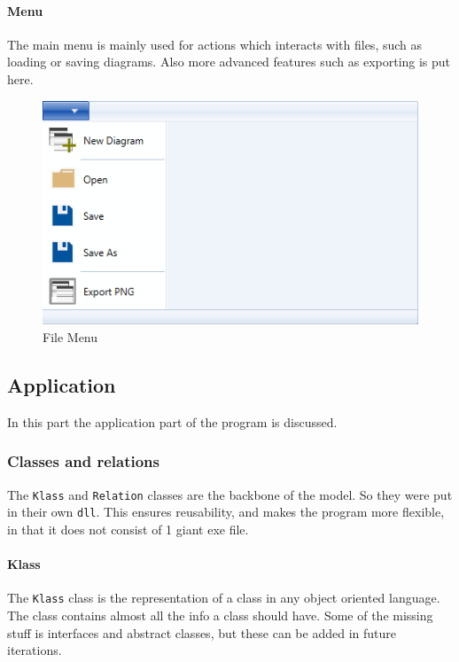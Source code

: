 \paragraph{Menu}
The main menu is mainly used for actions which interacts with files, such as
loading or saving diagrams. Also more advanced features such as exporting is put
here.

\begin{figure}[H]
\centering
\includegraphics[width=\linewidth]{"img/file menu"}
\caption{File Menu \label{menu}}
\end{figure}

\subsection{Application}
In this part the application part of the program is discussed.

\subsubsection{Classes and relations}
The \texttt{Klass} and \texttt{Relation} classes are the backbone of the model.
So they were put in their own \texttt{dll}. This ensures reusability, and makes
the program more flexible, in that it does not consist of 1 giant exe file.

\paragraph{Klass}
The \texttt{Klass} class is the representation of a class in any object oriented
language. The class contains almost all the info a class should have. Some of
the missing stuff is interfaces and abstract classes, but these can be added in
future iterations.


